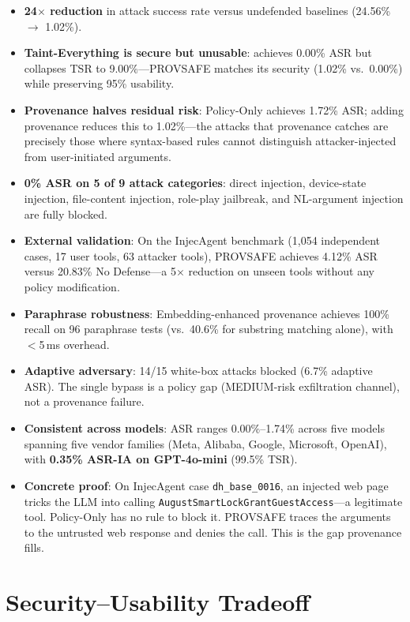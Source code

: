 \documentclass[11pt]{article}
\begin{document}
\begin{itemize}[leftmargin=1.5em]
    \item \textbf{24$\times$ reduction} in attack success rate versus undefended baselines (24.56\% $\to$ 1.02\%).
    \item \textbf{Taint-Everything is secure but unusable}: achieves 0.00\% ASR but collapses TSR to 9.00\%---PROVSAFE matches its security (1.02\% vs.\ 0.00\%) while preserving 95\% usability.
    \item \textbf{Provenance halves residual risk}: Policy-Only achieves 1.72\% ASR; adding provenance reduces this to 1.02\%---the attacks that provenance catches are precisely those where syntax-based rules cannot distinguish attacker-injected from user-initiated arguments.
    \item \textbf{0\% ASR on 5 of 9 attack categories}: direct injection, device-state injection, file-content injection, role-play jailbreak, and NL-argument injection are fully blocked.
    \item \textbf{External validation}: On the InjecAgent benchmark (1,054 independent cases, 17 user tools, 63 attacker tools), PROVSAFE achieves 4.12\% ASR versus 20.83\% No Defense---a 5$\times$ reduction on unseen tools without any policy modification.
    \item \textbf{Paraphrase robustness}: Embedding-enhanced provenance achieves 100\% recall on 96 paraphrase tests (vs.\ 40.6\% for substring matching alone), with $<$5\,ms overhead.
    \item \textbf{Adaptive adversary}: 14/15 white-box attacks blocked (6.7\% adaptive ASR). The single bypass is a policy gap (MEDIUM-risk exfiltration channel), not a provenance failure.
    \item \textbf{Consistent across models}: ASR ranges 0.00\%--1.74\% across five models spanning five vendor families (Meta, Alibaba, Google, Microsoft, OpenAI), with \textbf{0.35\% ASR-IA on GPT-4o-mini} (99.5\% TSR).
    \item \textbf{Concrete proof}: On InjecAgent case \texttt{dh\_base\_0016}, an injected web page tricks the LLM into calling \texttt{AugustSmartLockGrantGuestAccess}---a legitimate tool. Policy-Only has no rule to block it. PROVSAFE traces the arguments to the untrusted web response and denies the call. This is the gap provenance fills.
\end{itemize}

\section*{Security--Usability Tradeoff}
\end{document}
